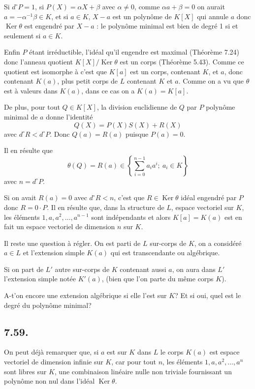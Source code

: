 Si $d^\circ P=1$, si $P(X)=\alpha X+\beta$ avec $\alpha\ne0$, comme $\alpha a+\beta=0$ on aurait $a=-\alpha^{-1}\beta\in K$, et si $a\in K$, $X-a$ est un polynôme de $K[X]$ qui annule $a$ donc $\operatorname{Ker}\theta$ est engendré par $X-a$ : le polynôme minimal est bien de degré 1 si et seulement si $a\in K$.

Enfin $P$ étant irréductible, l'idéal qu'il engendre est maximal (Théorème 7.24) donc l'anneau quotient $K[X]/\operatorname{Ker}\theta$ est un corps (Théorème 5.43). Comme ce quotient est isomorphe à  c'est que $K[a]$ est un corps, contenant $K$, et $a$, donc contenant $K(a)$, plus petit corps de $L$ contenant $K$ et $a$. Comme on a vu que $\theta$ est à valeurs dans $K(a)$, dans ce cas on a $K(a)=K[a]$.

De plus, pour tout $Q\in K[X]$, la division euclidienne de $Q$ par $P$ polynôme minimal de $a$ donne l'identité
\[
Q(X)=P(X)S(X)+R(X)
\]
avec $d^\circ R<d^\circ P$. Donc $Q(a)=R(a)$ puisque $P(a)=0$.

Il en résulte que
\[
\theta(Q)=R(a)\in\left\{\sum_{i=0}^{n-1}a_i a^i;\ a_i\in K\right\}
\]
avec $n=d^\circ P$.

Si on avait $R(a)=0$ avec $d^\circ R<n$, c'est que $R\in\operatorname{Ker}\theta$ idéal engendré par $P$ donc $R=0\cdot P$. Il en résulte que, dans la structure de $L$, espace vectoriel sur $K$, les éléments $1,a,a^2,\ldots,a^{n-1}$ sont indépendants et alors $K[a]=K(a)$ est en fait un espace vectoriel de dimension $n$ sur $K$. \bookend

Il reste une question à régler. On est parti de $L$ sur-corps de $K$, on a considéré $a\in L$ et l'extension simple $K(a)$ qui est transcendante ou algébrique.

Si on part de $L'$ autre sur-corps de $K$ contenant aussi $a$, on aura dans $L'$ l'extension simple notée $K'(a)$, (bien que l'on parte du même corps $K$).

A-t'on encore une extension algébrique si elle l'est sur $K$? Et si oui, quel est le degré du polynôme minimal?

\subsection*{7.59.}

On peut déjà remarquer que, si $a$ est  sur $K$ dans $L$ le corps $K(a)$ est espace vectoriel de dimension infinie sur $K$, car pour tout $n$, les éléments $1,a,a^2,\ldots,a^n$ sont libres sur $K$, une combinaison linéaire nulle non triviale fournissant un polynôme non nul dans l'idéal $\operatorname{Ker}\theta$.

